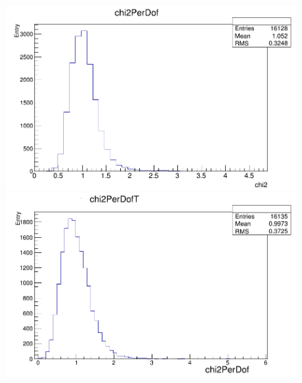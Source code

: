 \begin{figure}[H]    
\begin{minipage}[t]{0.55\textwidth}
\includegraphics[width=\linewidth]{rozdzial6/JPsi_chi2.png}
\end{minipage}
\hspace{\fill}
\begin{minipage}[t]{0.55\textwidth}
\includegraphics[width=\linewidth]{rozdzial6/JPsi_chi2T.png}
\end{minipage}


\end{figure}
